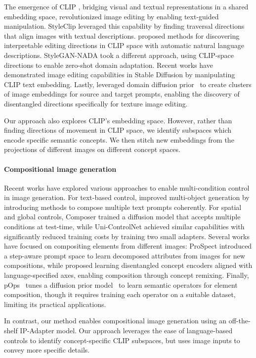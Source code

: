 The emergence of CLIP \citep{radford2021learning}, bridging visual and textual representations in a shared embedding space, revolutionized image editing by enabling text-guided manipulation. StyleClip \citep{patashnik2021styleclip} leveraged this capability by finding traversal directions that align images with textual descriptions. \citet{abdal2021clip2stylegan} proposed methods for discovering interpretable editing directions in CLIP space with automatic natural language descriptions. StyleGAN-NADA \citep{gal2021stylegannadaclipguideddomainadaptation} took a different approach, using CLIP-space directions to enable zero-shot domain adaptation. 
Recent works \citep{baumann2024continuoussubjectspecificattributecontrol, zhuang2024magnetknowtexttoimagediffusion} have demonstrated image editing capabilities in Stable Diffusion by manipulating CLIP text embedding.
Lastly, \citet{Guerrero_Viu_2024} leveraged domain diffusion prior~\citep{ramesh2022hierarchical, aggarwal2023controlledconditionaltextimage} to create clusters of image embeddings for source and target prompts, enabling the discovery of disentangled directions specifically for texture image editing.

Our approach also explores CLIP's embedding space. However, rather than finding directions of movement in CLIP space, we identify subspaces which encode specific semantic concepts. We then stitch new embeddings from the projections of different images on different concept spaces.

\paragraph{\textbf{Compositional image generation}}
Recent works have explored various approaches to enable multi-condition control in image generation. For text-based control, \citep{liu2023compositionalvisualgenerationcomposable} improved multi-object generation by introducing methods to compose multiple text prompts coherently. For spatial and global controls, Composer \citep{huang2023composercreativecontrollableimage} trained a diffusion model that accepts multiple conditions at test-time, while Uni-ControlNet \citep{zhao2023unicontrolnetallinonecontroltexttoimage} achieved similar capabilities with significantly reduced training costs by training two small adapters. Several works have focused on compositing elements from different images: ProSpect \citep{zhang2023prospectpromptspectrumattributeaware} introduced a step-aware prompt space to learn decomposed attributes from images for new compositions, while \citet{lee2024languageinformedvisualconceptlearning} proposed learning disentangled concept encoders aligned with language-specified axes, enabling composition through concept remixing. Finally, pOps~\citep{richardson2024popsphotoinspireddiffusionoperators} tunes a diffusion prior model~\citep{ramesh2022hierarchical} to learn semantic operators for element composition, though it requires training each operator on a suitable dataset, limiting its practical applications.

In contrast, our method enables compositional image generation using an off-the-shelf IP-Adapter model. Our approach leverages the ease of language-based controls to identify concept-specific CLIP subspaces, but uses image inputs to convey more specific details.
